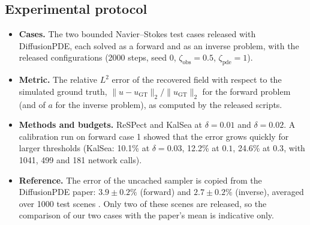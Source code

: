 \subsection{Experimental protocol}
\begin{itemize}
  \item \textbf{Cases.} The two bounded Navier--Stokes test cases released with DiffusionPDE, each solved as a forward and as an inverse problem, with the released configurations (2000 steps, seed 0, $\zeta_{\mathrm{obs}}=0.5$, $\zeta_{\mathrm{pde}}=1$).
  \item \textbf{Metric.} The relative $L^2$ error of the recovered field with respect to the simulated ground truth, $\|u-u_{\mathrm{GT}}\|_2/\|u_{\mathrm{GT}}\|_2$ for the forward problem (and of $a$ for the inverse problem), as computed by the released scripts.
  \item \textbf{Methods and budgets.} ReSPect and KalSea at $\delta=0.01$ and $\delta=0.02$. A calibration run on forward case 1 showed that the error grows quickly for larger thresholds (KalSea: 10.1\% at $\delta=0.03$, 12.2\% at $0.1$, 24.6\% at $0.3$, with 1041, 499 and 181 network calls).
  \item \textbf{Reference.} The error of the uncached sampler is copied from the DiffusionPDE paper: $3.9\pm0.2\%$ (forward) and $2.7\pm0.2\%$ (inverse), averaged over 1000 test scenes \citep{huang2024diffusionpde}. Only two of these scenes are released, so the comparison of our two cases with the paper's mean is indicative only.
\end{itemize}

